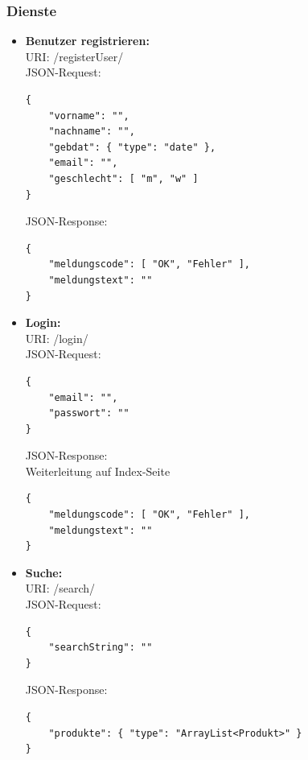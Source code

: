 \documentclass[a4paper,12pt]{article} %
\begin{document}
\subsubsection{Dienste}
\begin{itemize}
	\item[] \textbf{Benutzer registrieren:}\\
	URI: /registerUser/\\
	JSON-Request:\\
	\begin{lstlisting}
{
	"vorname": "",
	"nachname": "",
	"gebdat": { "type": "date" },
	"email": "",
	"geschlecht": [ "m", "w" ]
}
	\end{lstlisting}
	JSON-Response:\\
	\begin{lstlisting}
{
	"meldungscode": [ "OK", "Fehler" ],
	"meldungstext": ""
}
	\end{lstlisting}
	
	\item[] \textbf{Login:}\\
	URI: /login/\\
	JSON-Request:\\
	\begin{lstlisting}
{
	"email": "",
	"passwort": ""
}
	\end{lstlisting}
	JSON-Response:\\
	Weiterleitung auf Index-Seite\\
	\begin{lstlisting}
{
	"meldungscode": [ "OK", "Fehler" ],
	"meldungstext": ""
}
	\end{lstlisting}
	
	\item[] \textbf{Suche:}\\
	URI: /search/\\
	JSON-Request:\\
	\begin{lstlisting}
{
	"searchString": ""
}
	\end{lstlisting}
	JSON-Response:\\
	\begin{lstlisting}
{
	"produkte": { "type": "ArrayList<Produkt>" }
}
	\end{lstlisting}
	

\end{itemize}
\end{document}

